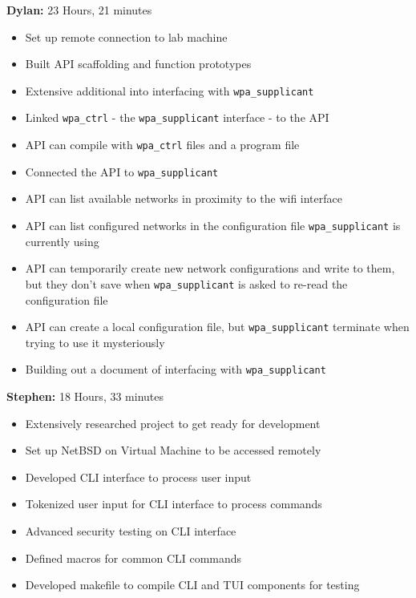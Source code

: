 \documentclass[11pt]{article}
\begin{document}
\textbf{Dylan:} 23 Hours, 21 minutes
\begin{itemize}
  \item Set up remote connection to lab machine
  \item Built API scaffolding and function prototypes
  \item Extensive additional into interfacing with \texttt{wpa\_supplicant}
  \item Linked \texttt{wpa\_ctrl} - the \texttt{wpa\_supplicant} interface - to the API
  \item API can compile with \texttt{wpa\_ctrl} files and a program file
  \item Connected the API to \texttt{wpa\_supplicant}
  \item API can list available networks in proximity to the wifi interface
  \item API can list configured networks in the configuration file \texttt{wpa\_supplicant} is currently using
  \item API can temporarily create new network configurations and write to them, but they don't save when 
    \texttt{wpa\_supplicant} is asked to re-read the configuration file
  \item API can create a local configuration file, but \texttt{wpa\_supplicant} terminate when trying to use it mysteriously
  \item Building out a document of interfacing with \texttt{wpa\_supplicant}
\end{itemize}

\textbf{Stephen:} 18 Hours, 33 minutes
\begin{itemize}
  \item Extensively researched project to get ready for development 
  \item Set up NetBSD on Virtual Machine to be accessed remotely
  \item Developed CLI interface to process user input
  \item Tokenized user input for CLI interface to process commands
  \item Advanced security testing on CLI interface 
  \item Defined macros for common CLI commands
  \item Developed makefile to compile CLI and TUI components for testing 
\end{itemize}
\end{document}
